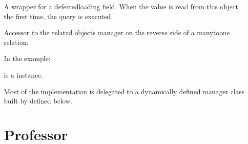 \documentclass[letterpaper,10pt,english]{sphinxmanual}
\begin{document}
\begin{fulllineitems}

\begin{fulllineitems}
\label{\detokenize{models/issue:api.models.issue.Issues.severity}}
\pysigstartsignatures
{}
\pysigstopsignatures
\sphinxAtStartPar
A wrapper for a deferred\sphinxhyphen{}loading field. When the value is read from this
object the first time, the query is executed.

\end{fulllineitems}


\begin{fulllineitems}
\label{\detokenize{models/issue:api.models.issue.Issues.ticket_set}}
\pysigstartsignatures
{}
\pysigstopsignatures
\sphinxAtStartPar
Accessor to the related objects manager on the reverse side of a
many\sphinxhyphen{}to\sphinxhyphen{}one relation.

\sphinxAtStartPar
In the example:

\begin{sphinxVerbatim}[commandchars=\\\{\}]
 
       
\end{sphinxVerbatim}

\sphinxAtStartPar
{} is a  instance.

\sphinxAtStartPar
Most of the implementation is delegated to a dynamically defined manager
class built by  defined below.

\end{fulllineitems}


\end{fulllineitems}


\sphinxstepscope


\section{Professor}
\label{\detokenize{models/professor:module-api.models.professor}}\label{\detokenize{models/professor:professor}}\label{\detokenize{models/professor::doc}}
\end{document}
